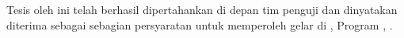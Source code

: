 \chapter*{\lembarpersetujuanpenguji}
\begin{justifying}

\setlength{\parindent}{0pt}

      \fontsize{12pt}{14pt}\selectfont Tesis oleh {\peneliti} ini telah berhasil dipertahankan di depan tim penguji dan dinyatakan diterima sebagai sebagian persyaratan untuk memperoleh gelar {\gelar} di {\prodi}, Program {\fakultas}, {\universitas}. \\









\end{justifying}
